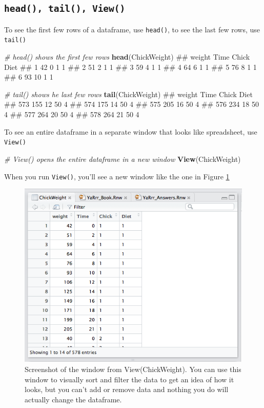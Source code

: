 \documentclass[]{book}
\newenvironment{Shaded}{\begin{snugshade}}{\end{snugshade}}
\newcommand{\KeywordTok}[1]{\textcolor[rgb]{0.13,0.29,0.53}{\textbf{{#1}}}}
\newcommand{\CommentTok}[1]{\textcolor[rgb]{0.56,0.35,0.01}{\textit{{#1}}}}
\newcommand{\NormalTok}[1]{{#1}}
\theoremstyle{definition}
\theoremstyle{definition}
\theoremstyle{remark}
\begin{document}
\subsection{\texorpdfstring{\texttt{head(),\ tail(),\ View()}}{head(), tail(), View()}}\label{head-tail-view}

To see the first few rows of a dataframe, use \texttt{head()}, to see
the last few rows, use \texttt{tail()}

\begin{Shaded}
\begin{Highlighting}[]
\CommentTok{# head() shows the first few rows}
\KeywordTok{head}\NormalTok{(ChickWeight)}
\NormalTok{##   weight Time Chick Diet}
\NormalTok{## 1     42    0     1    1}
\NormalTok{## 2     51    2     1    1}
\NormalTok{## 3     59    4     1    1}
\NormalTok{## 4     64    6     1    1}
\NormalTok{## 5     76    8     1    1}
\NormalTok{## 6     93   10     1    1}

\CommentTok{# tail() shows he last few rows}
\KeywordTok{tail}\NormalTok{(ChickWeight)}
\NormalTok{##     weight Time Chick Diet}
\NormalTok{## 573    155   12    50    4}
\NormalTok{## 574    175   14    50    4}
\NormalTok{## 575    205   16    50    4}
\NormalTok{## 576    234   18    50    4}
\NormalTok{## 577    264   20    50    4}
\NormalTok{## 578    264   21    50    4}
\end{Highlighting}
\end{Shaded}

To see an entire dataframe in a separate window that looks like
spreadsheet, use \texttt{View()}

\begin{Shaded}
\begin{Highlighting}[]
\CommentTok{# View() opens the entire dataframe in a new window}
\KeywordTok{View}\NormalTok{(ChickWeight)}
\end{Highlighting}
\end{Shaded}

When you run \texttt{View()}, you'll see a new window like the one in
Figure \ref{fig:viewchicks}

\begin{figure}

{\centering \includegraphics[width=0.5\linewidth]{images/chickweightscreenshot} 

}

\caption{Screenshot of the window from View(ChickWeight). You can use this window to visually sort and filter the data to get an idea of how it looks, but you can't add or remove data and nothing you do will actually change the dataframe.}\label{fig:viewchicks}
\end{figure}
\end{document}
